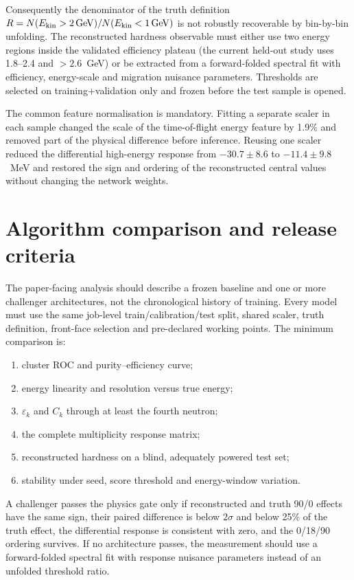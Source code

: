 \documentclass[11pt,a4paper]{article}
\newcommand{\Ekin}{E_{\rm kin}}
\newcommand{\Rhard}{R=N(\Ekin>2\,\mathrm{GeV})/N(\Ekin<1\,\mathrm{GeV})}
\begin{document}
Consequently the denominator of the truth definition $\Rhard$ is not robustly
recoverable by bin-by-bin unfolding.  The reconstructed hardness observable
must either use two energy regions inside the validated efficiency plateau
(the current held-out study uses 1.8--2.4 and $>2.6$~GeV) or be extracted from
a forward-folded spectral fit with efficiency, energy-scale and migration
nuisance parameters.  Thresholds are selected on training+validation only and
frozen before the test sample is opened.

The common feature normalisation is mandatory.  Fitting a separate scaler in
each sample changed the scale of the time-of-flight energy feature by 1.9\% and
removed part of the physical difference before inference.  Reusing one scaler
reduced the differential high-energy response from
$-30.7\pm8.6$ to $-11.4\pm9.8$~MeV and restored the sign and ordering of the
reconstructed central values without changing the network weights.

\section{Algorithm comparison and release criteria}

The paper-facing analysis should describe a frozen baseline and one or more
challenger architectures, not the chronological history of training.  Every
model must use the same job-level train/calibration/test split, shared scaler,
truth definition, front-face selection and pre-declared working points.  The
minimum comparison is:
\begin{enumerate}[leftmargin=*]
\item cluster ROC and purity--efficiency curve;
\item energy linearity and resolution versus true energy;
\item $\varepsilon_k$ and $C_k$ through at least the fourth neutron;
\item the complete multiplicity response matrix;
\item reconstructed hardness on a blind, adequately powered test set;
\item stability under seed, score threshold and energy-window variation.
\end{enumerate}

A challenger passes the physics gate only if reconstructed and truth 90/0
effects have the same sign, their paired difference is below $2\sigma$ and
below 25\% of the truth effect, the differential response is consistent with
zero, and the 0/18/90 ordering survives.  If no architecture passes, the
measurement should use a forward-folded spectral fit with response nuisance
parameters instead of an unfolded threshold ratio.
\end{document}
